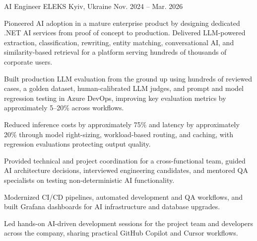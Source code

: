
\begin{cventries}

%
  \cventry
    {AI Engineer} %
    {ELEKS} %
    {Kyiv, Ukraine} %
    {Nov. 2024 – Mar. 2026} %
    {
      \begin{cvitems} %
        \item {Pioneered AI adoption in a mature enterprise product by designing dedicated .NET AI services from proof of concept to production. Delivered LLM-powered extraction, classification, rewriting, entity matching, conversational AI, and similarity-based retrieval for a platform serving hundreds of thousands of corporate users.}
        \item {Built production LLM evaluation from the ground up using hundreds of reviewed cases, a golden dataset, human-calibrated LLM judges, and prompt and model regression testing in Azure DevOps, improving key evaluation metrics by approximately 5--20\% across workflows.}
        \item {Reduced inference costs by approximately 75\% and latency by approximately 20\% through model right-sizing, workload-based routing, and caching, with regression evaluations protecting output quality.}
        \item {Provided technical and project coordination for a cross-functional team, guided AI architecture decisions, interviewed engineering candidates, and mentored QA specialists on testing non-deterministic AI functionality.}
        \item {Modernized CI/CD pipelines, automated development and QA workflows, and built Grafana dashboards for AI infrastructure and database upgrades.}
        \item {Led hands-on AI-driven development sessions for the project team and developers across the company, sharing practical GitHub Copilot and Cursor workflows.}
      \end{cvitems}
    }


\end{cventries}
